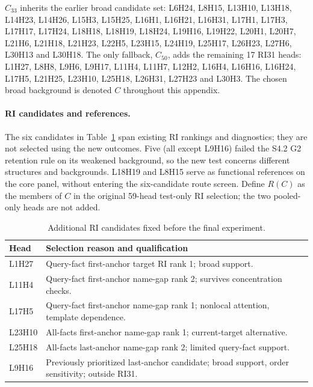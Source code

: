 $C_{33}$ inherits the earlier broad candidate set: L6H24, L8H15, L13H10,
L13H18, L14H23, L14H26, L15H3, L15H25, L16H1, L16H21, L16H31, L17H1,
L17H3, L17H17, L17H24, L18H18, L18H19, L18H24, L19H16, L19H22, L20H1,
L20H7, L21H6, L21H18, L21H23, L22H5, L23H15, L24H19, L25H17, L26H23,
L27H6, L30H13 and L30H18. The only fallback, $C_{50}$, adds the remaining
17 RI31 heads: L1H27, L8H8, L9H6, L9H17, L11H4, L11H7, L12H2, L16H4,
L16H16, L16H24, L17H5, L21H25, L23H10, L25H18, L26H31, L27H23 and L30H3.
The chosen broad background is denoted $C$ throughout this appendix.

\paragraph{RI candidates and references.}
The six candidates in Table~\ref{tab:final-candidates} span existing RI rankings
and diagnostics; they are not selected using the new outcomes. Five (all except
L9H16) failed the S4.2 G2 retention rule on its weakened background, so the new
test concerns different structures and backgrounds. L18H19 and L8H15 serve as
functional references on the core panel, without entering the six-candidate route
screen. Define $R(C)$ as the members of $C$ in the original 59-head test-only RI
selection; the two pooled-only heads are not added.

\begin{table}[t]
\centering\small
\setlength{\tabcolsep}{3pt}
\begin{tabular}{@{}p{1.15cm}p{6.2cm}@{}}
\toprule
Head & Selection reason and qualification \\
\midrule
L1H27 & Query-fact first-anchor target RI rank 1; broad support. \\
L11H4 & Query-fact first-anchor name-gap rank 2; survives concentration checks. \\
L17H5 & Query-fact first-anchor name-gap rank 1; nonlocal attention, template dependence. \\
L23H10 & All-facts first-anchor name-gap rank 1; current-target alternative. \\
L25H18 & All-facts last-anchor name-gap rank 2; limited query-fact support. \\
L9H16 & Previously prioritized last-anchor candidate; broad support, order sensitivity; outside RI31. \\
\bottomrule
\end{tabular}
\caption{Additional RI candidates fixed before the final experiment.}
\label{tab:final-candidates}
\end{table}


